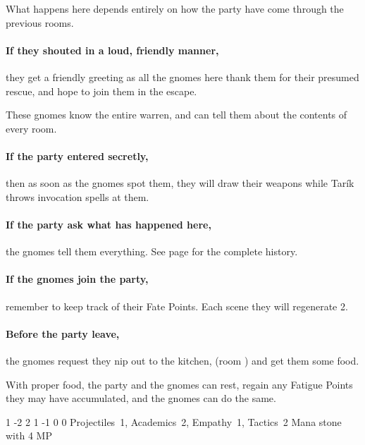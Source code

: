 \begin{multicols}{2}

What happens here depends entirely on how the party have come through the previous rooms.

\paragraph{If they shouted in a loud, friendly manner,}
they get a friendly greeting as all the gnomes here thank them for their presumed rescue, and hope to join them in the escape.

These gnomes know the entire warren, and can tell them about the contents of every room.

\paragraph{If the party entered secretly,}
then as soon as the gnomes spot them, they will draw their weapons while Tar\'ik throws invocation spells at them.

\paragraph{If the party ask what has happened here,}
the gnomes tell them everything.
See page \pageref{invasionhistory} for the complete history.

\paragraph{If the gnomes join the party,}
remember to keep track of their Fate Points.
Each scene they will regenerate 2.

\setcounter{enc}{\value{list}}
\addtocounter{enc}{1}

\paragraph{Before the party leave,}
the gnomes request they nip out to the kitchen, (room ) and get them some food.

With proper food, the party and the gnomes can rest, regain any Fatigue Points they may have accumulated, and the gnomes can do the same.




{1}%
{-2}%
{{2}%
{1}%
{-1}}%
{0}%
{0}%
{Projectiles~1, Academics~2, Empathy~1, Tactics~2
}%
{Mana stone with 4 MP}%
{\addtocounter{sp}{8}}


\end{multicols}
